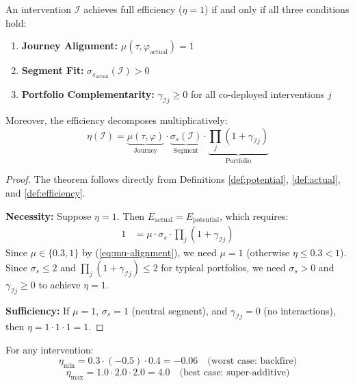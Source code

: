 \begin{theorem}
\label{thm:eih}
An intervention $\mathcal{I}$ achieves full efficiency ($\eta = 1$) if and only if
all three conditions hold:
\begin{enumerate}
\item \textbf{Journey Alignment:} $\mu(\tau, \varphi_{\text{actual}}) = 1$
\item \textbf{Segment Fit:} $\sigma_{s_{\text{actual}}}(\mathcal{I}) > 0$
\item \textbf{Portfolio Complementarity:} $\gamma_{\mathcal{I}j} \geq 0$ for all co-deployed interventions $j$
\end{enumerate}

Moreover, the efficiency decomposes multiplicatively:
\begin{equation}
\eta(\mathcal{I}) = \underbrace{\mu(\tau, \varphi)}_{\text{Journey}} \cdot \underbrace{\sigma_s(\mathcal{I})}_{\text{Segment}} \cdot \underbrace{\prod_j (1 + \gamma_{\mathcal{I}j})}_{\text{Portfolio}}
\label{eq:eih-decomposition}
\end{equation}
\end{theorem}

\begin{proof}
The theorem follows directly from Definitions \ref{def:potential}, \ref{def:actual},
and \ref{def:efficiency}.

\textbf{Necessity:} Suppose $\eta = 1$. Then $E_{\text{actual}} = E_{\text{potential}}$,
which requires:
\begin{align}
1 &= \mu \cdot \sigma_s \cdot \prod_j (1 + \gamma_{\mathcal{I}j})
\end{align}
Since $\mu \in \{0.3, 1\}$ by (\ref{eq:mu-alignment}), we need $\mu = 1$ (otherwise
$\eta \leq 0.3 < 1$). Since $\sigma_s \leq 2$ and $\prod_j (1 + \gamma_{\mathcal{I}j}) \leq 2$
for typical portfolios, we need $\sigma_s > 0$ and $\gamma_{\mathcal{I}j} \geq 0$ to achieve $\eta = 1$.

\textbf{Sufficiency:} If $\mu = 1$, $\sigma_s = 1$ (neutral segment), and $\gamma_{\mathcal{I}j} = 0$
(no interactions), then $\eta = 1 \cdot 1 \cdot 1 = 1$.
\end{proof}

\begin{corollary}
\label{cor:bounds}
For any intervention:
\begin{equation}
\eta_{\min} = 0.3 \cdot (-0.5) \cdot 0.4 = -0.06 \quad \text{(worst case: backfire)}
\end{equation}
\begin{equation}
\eta_{\max} = 1.0 \cdot 2.0 \cdot 2.0 = 4.0 \quad \text{(best case: super-additive)}
\end{equation}
\end{corollary}

